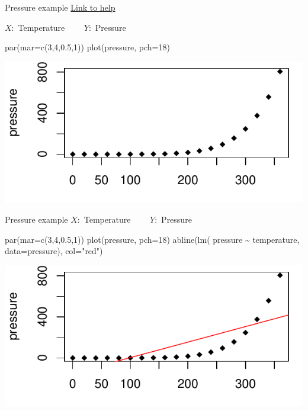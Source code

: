 \documentclass[
  ignorenonframetext,
]{beamer}
\newenvironment{Shaded}{\begin{snugshade}}{\end{snugshade}}
\newcommand{\AttributeTok}[1]{\textcolor[rgb]{0.77,0.63,0.00}{#1}}
\newcommand{\DecValTok}[1]{\textcolor[rgb]{0.00,0.00,0.81}{#1}}
\newcommand{\FloatTok}[1]{\textcolor[rgb]{0.00,0.00,0.81}{#1}}
\newcommand{\FunctionTok}[1]{\textcolor[rgb]{0.00,0.00,0.00}{#1}}
\newcommand{\NormalTok}[1]{#1}
\newcommand{\SpecialCharTok}[1]{\textcolor[rgb]{0.00,0.00,0.00}{#1}}
\newcommand{\StringTok}[1]{\textcolor[rgb]{0.31,0.60,0.02}{#1}}
\begin{document}
\begin{frame}[fragile]{Pressure example}
\protect\hypertarget{pressure-example}{}
\href{./pressure.html}{Link to help}

\(X:\) Temperature \(\qquad Y:\) Pressure

\begin{Shaded}
\begin{Highlighting}[]
\FunctionTok{par}\NormalTok{(}\AttributeTok{mar=}\FunctionTok{c}\NormalTok{(}\DecValTok{3}\NormalTok{,}\DecValTok{4}\NormalTok{,}\FloatTok{0.5}\NormalTok{,}\DecValTok{1}\NormalTok{))}
\FunctionTok{plot}\NormalTok{(pressure, }\AttributeTok{pch=}\DecValTok{18}\NormalTok{)}
\end{Highlighting}
\end{Shaded}

\includegraphics{Lec1_files/figure-beamer/pre1-1.pdf}
\end{frame}

\begin{frame}[fragile]{Pressure example}
\protect\hypertarget{pressure-example-1}{}
\(X:\) Temperature \(\qquad Y:\) Pressure

\begin{Shaded}
\begin{Highlighting}[]
\FunctionTok{par}\NormalTok{(}\AttributeTok{mar=}\FunctionTok{c}\NormalTok{(}\DecValTok{3}\NormalTok{,}\DecValTok{4}\NormalTok{,}\FloatTok{0.5}\NormalTok{,}\DecValTok{1}\NormalTok{))}
\FunctionTok{plot}\NormalTok{(pressure, }\AttributeTok{pch=}\DecValTok{18}\NormalTok{)}
\FunctionTok{abline}\NormalTok{(}\FunctionTok{lm}\NormalTok{( pressure }\SpecialCharTok{\textasciitilde{}}\NormalTok{ temperature, }\AttributeTok{data=}\NormalTok{pressure), }\AttributeTok{col=}\StringTok{"red"}\NormalTok{)}
\end{Highlighting}
\end{Shaded}

\includegraphics{Lec1_files/figure-beamer/pre2-1.pdf}
\end{frame}
\end{document}
